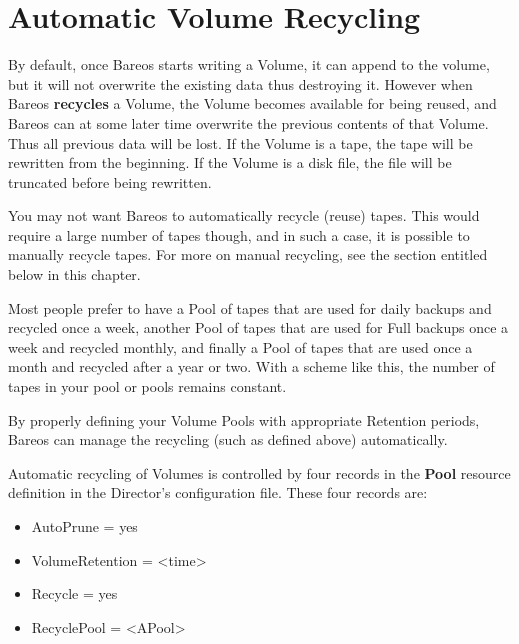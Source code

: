 
\chapter{Automatic Volume Recycling}
\label{RecyclingChapter}

By default, once Bareos starts writing a Volume, it can append to the
volume, but it will not overwrite the existing data thus destroying it.
However when Bareos {\bf recycles} a Volume, the Volume becomes available
for being reused, and Bareos can at some later time overwrite the previous
contents of that Volume.  Thus all previous data will be lost.  If the
Volume is a tape, the tape will be rewritten from the beginning.  If the
Volume is a disk file, the file will be truncated before being rewritten.

You may not want Bareos to automatically recycle (reuse) tapes.  This would
require a large number of tapes though, and in such a case, it is possible
to manually recycle tapes.  For more on manual recycling, see the section
entitled  below in this
chapter.

Most people prefer to have a Pool of tapes that are used for daily backups and
recycled once a week, another Pool of tapes that are used for Full backups
once a week and recycled monthly, and finally a Pool of tapes that are used
once a month and recycled after a year or two. With a scheme like this, the
number of tapes in your pool or pools remains constant.

By properly defining your Volume Pools with appropriate Retention periods,
Bareos can manage the recycling (such as defined above) automatically.

Automatic recycling of Volumes is controlled by four records in the {\bf
Pool} resource definition in the Director's configuration file. These four
records are:

\begin{itemize}
\item AutoPrune = yes
\item VolumeRetention = {\textless}time{\textgreater}
\item Recycle = yes
\item RecyclePool = {\textless}APool{\textgreater} %
\end{itemize}

